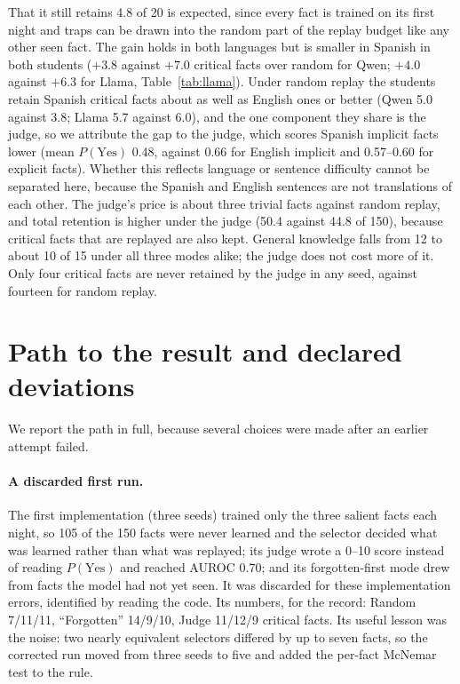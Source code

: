 \documentclass[11pt,a4paper]{article}
\begin{document}
That it still retains 4.8 of 20 is expected, since every fact is trained on its first night and traps can be drawn into the random part of the replay budget like any other seen fact.
The gain holds in both languages but is smaller in Spanish in both students ($+3.8$ against $+7.0$ critical facts over random for Qwen; $+4.0$ against $+6.3$ for Llama, Table~\ref{tab:llama}).
Under random replay the students retain Spanish critical facts about as well as English ones or better (Qwen 5.0 against 3.8; Llama 5.7 against 6.0), and the one component they share is the judge, so we attribute the gap to the judge, which scores Spanish implicit facts lower (mean $P(\text{Yes})$ 0.48, against 0.66 for English implicit and 0.57--0.60 for explicit facts).
Whether this reflects language or sentence difficulty cannot be separated here, because the Spanish and English sentences are not translations of each other.
The judge's price is about three trivial facts against random replay, and total retention is higher under the judge (50.4 against 44.8 of 150), because critical facts that are replayed are also kept.
General knowledge falls from 12 to about 10 of 15 under all three modes alike; the judge does not cost more of it.
Only four critical facts are never retained by the judge in any seed, against fourteen for random replay.

\section{Path to the result and declared deviations}
\label{sec:deviations}

We report the path in full, because several choices were made after an earlier attempt failed.

\paragraph{A discarded first run.}
The first implementation (three seeds) trained only the three salient facts each night, so 105 of the 150 facts were never learned and the selector decided what was learned rather than what was replayed; its judge wrote a 0--10 score instead of reading $P(\text{Yes})$ and reached AUROC 0.70; and its forgotten-first mode drew from facts the model had not yet seen.
It was discarded for these implementation errors, identified by reading the code.
Its numbers, for the record: Random 7/11/11, ``Forgotten'' 14/9/10, Judge 11/12/9 critical facts.
Its useful lesson was the noise: two nearly equivalent selectors differed by up to seven facts, so the corrected run moved from three seeds to five and added the per-fact McNemar test to the rule.
\end{document}
